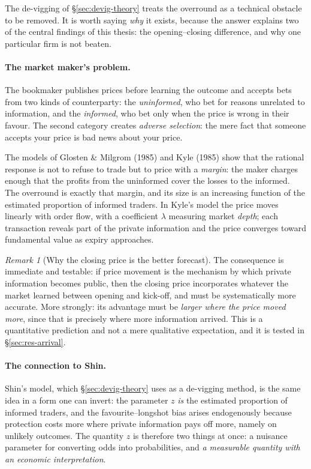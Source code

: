 \documentclass[12pt,a4paper,oneside]{report}
\renewcommand{\_}{\oldunderscore\allowbreak}
\theoremstyle{definition}
\theoremstyle{plain}
\theoremstyle{remark}
\newtheorem{remark}[theorem]{Remark}
\begin{document}
The de-vigging of \S\ref{sec:devig-theory} treats the overround as a technical obstacle to be
removed. It is worth saying \emph{why} it exists, because the answer explains two of the
central findings of this thesis: the opening--closing difference, and why one particular firm
is not beaten.

\paragraph{The market maker's problem.} The bookmaker publishes prices before learning the
outcome and accepts bets from two kinds of counterparty: the \emph{uninformed}, who bet for
reasons unrelated to information, and the \emph{informed}, who bet only when the price is wrong
in their favour. The second category creates \emph{adverse selection}: the mere fact that
someone accepts your price is bad news about your price.

The models of Glosten \& Milgrom (1985) and Kyle (1985) show that the rational response is not
to refuse to trade but to price with a \emph{margin}: the maker charges enough that the profits
from the uninformed cover the losses to the informed. The overround is exactly that margin, and
its size is an increasing function of the estimated proportion of informed traders. In Kyle's
model the price moves linearly with order flow, with a coefficient $\lambda$ measuring market
\emph{depth}; each transaction reveals part of the private information and the price converges
toward fundamental value as expiry approaches.

\begin{remark}[Why the closing price is the better forecast]
\label{rem:closing}
The consequence is immediate and testable: if price movement is the mechanism by which private
information becomes public, then the closing price incorporates whatever the market learned
between opening and kick-off, and must be systematically more accurate. More strongly: its
advantage must be \emph{larger where the price moved more}, since that is precisely where more
information arrived. This is a quantitative prediction and not a mere qualitative expectation,
and it is tested in \S\ref{sec:res-arrival}.
\end{remark}

\paragraph{The connection to Shin.} Shin's model, which \S\ref{sec:devig-theory} uses as a
de-vigging method, is the same idea in a form one can invert: the parameter $z$ \emph{is} the
estimated proportion of informed traders, and the favourite--longshot bias arises endogenously
because protection costs more where private information pays off more, namely on unlikely
outcomes. The quantity $z$ is therefore two things at once: a nuisance parameter for converting
odds into probabilities, and \emph{a measurable quantity with an economic interpretation}.
\end{document}
